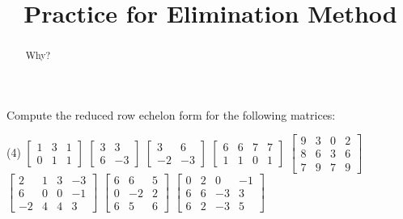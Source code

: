 \documentclass{ximera}
\title{Practice for Elimination Method}
\begin{document}
\begin{abstract}
Why?
\end{abstract}
\maketitle


\begin{exercise}
    Compute the reduced row echelon form for the following matrices:
    \begin{tasks}(4)
        \task
        $\begin{bmatrix}
            1 & 3 & 1 \\
            0 & 1 & 1
        \end{bmatrix}$
        \task
        $\begin{bmatrix}
            3 & 3 \\
            6 & -3
        \end{bmatrix}$
        \task
        $\begin{bmatrix}
            3 & 6 \\
            -2 & -3
        \end{bmatrix}$
        \task
        $\begin{bmatrix}
            6 & 6 & 7 & 7 \\
            1 & 1 & 0 & 1
        \end{bmatrix}$
        \task
        $\begin{bmatrix}
            9 & 3 & 0 & 2 \\
            8 & 6 & 3 & 6 \\
            7 & 9 & 7 & 9
        \end{bmatrix}$
        \task
        $\begin{bmatrix}
            2 & 1 & 3 & -3 \\
            6 & 0 & 0 & -1 \\
            -2 & 4 & 4 & 3
        \end{bmatrix}$
        \task
        $\begin{bmatrix}
            6 & 6 & 5 \\
            0 & -2 & 2 \\
            6 & 5 & 6
        \end{bmatrix}$
        \task
        $\begin{bmatrix}
            0 & 2 & 0 & -1 \\
            6 & 6 & -3 & 3 \\
            6 & 2 & -3 & 5
        \end{bmatrix}$
    \end{tasks}
\end{exercise}
\end{document}
